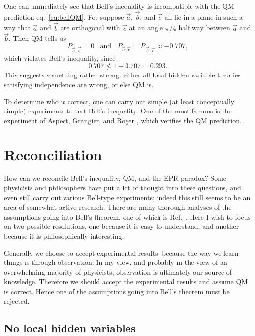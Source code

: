 One can immediately see that Bell's inequality is incompatible with
the QM prediction eq.~\eqref{eq:bellQM}. For suppose $\vec{a}$, $\vec{b}$,
and $\vec{c}$ all lie in a plane in such a way that $\vec{a}$ and $\vec{b}$
are orthogonal with $\vec{c}$ at an angle $\pi/4$ half way between
$\vec{a}$ and $\vec{b}$. Then QM tells us
\begin{equation}
  P_{\vec{a},\vec{b}}=0~~~~\text{and}~~~~
  P_{\vec{a},\vec{c}}=P_{\,\vec{b},\vec{c}}\approx-0.707,
\end{equation}
which violates Bell's inequality, since
\begin{equation}
  0.707\nleq1-0.707=0.293.
\end{equation}
This suggests something rather strong: either all local hidden variable 
theories satisfying independence are wrong, or else QM is.

To determine who is correct, one can carry out simple (at least conceptually
simple) experiments to test Bell's inequality. One of the most famous
is the experiment of Aspect, Grangier, and Roger
\cite{aspect_experimental_1982}, which verifies the QM prediction. 

\section{Reconciliation}\label{sec:interpretingBell}

How can we reconcile Bell's inequality, QM, and the EPR paradox? Some
physicists and philosophers have put a lot of thought into these questions,
and even still carry out various Bell-type experiments;
indeed this still seems to be an area of somewhat active research.
There are many thorough analyses of the assumptions going into Bell's
theorem, one of which is Ref.~\cite{platoStanfordBell}. Here I wish
to focus on two possible resolutions, one because it is
easy to understand, and another because it is philosophically interesting.

Generally we choose to accept experimental results, because the way we
learn things is through observation. In my view, and probably in the view
of an overwhelming majority of physicists, observation is ultimately
our source of knowledge. Therefore we should accept the experimental
results and assume QM is correct. Hence one of the assumptions going into
Bell's theorem must be rejected.

\subsection{No local hidden variables}


